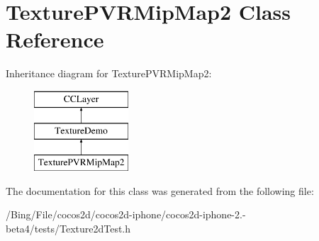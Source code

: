 \hypertarget{interface_texture_p_v_r_mip_map2}{\section{Texture\-P\-V\-R\-Mip\-Map2 Class Reference}
\label{interface_texture_p_v_r_mip_map2}
}
Inheritance diagram for Texture\-P\-V\-R\-Mip\-Map2\-:\begin{figure}[H]
\begin{center}
\leavevmode
\includegraphics[height=3.000000cm]{interface_texture_p_v_r_mip_map2}
\end{center}
\end{figure}


The documentation for this class was generated from the following file\-:\begin{DoxyCompactItemize}
\item 
/\-Bing/\-File/cocos2d/cocos2d-\/iphone/cocos2d-\/iphone-\/2.-\/beta4/tests/Texture2d\-Test.\-h\end{DoxyCompactItemize}
